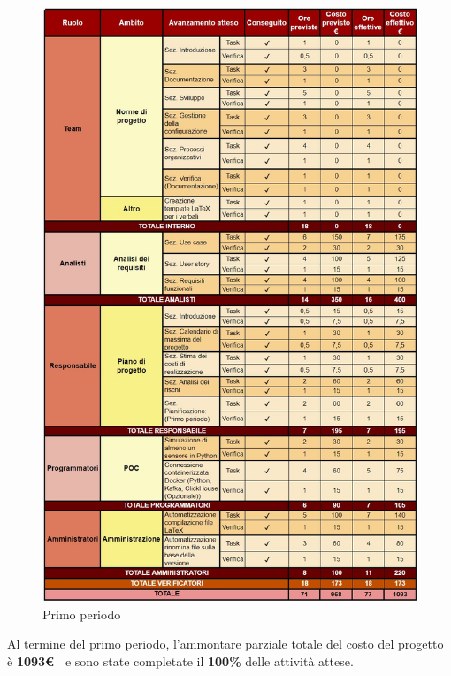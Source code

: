 \documentclass{article}
\begin{document}
\begin{figure}[H]
    \centering
    \includegraphics[height=1.1\textwidth]{../Images/periodo1.jpg}
    \caption{Primo periodo}
    \label{fig:1periodo}
\end{figure}

Al termine del primo periodo, l'ammontare parziale totale del costo del progetto è \textbf{ 1093\euro\ } e sono state completate il \textbf{100\%} delle attività attese.
\end{document}
